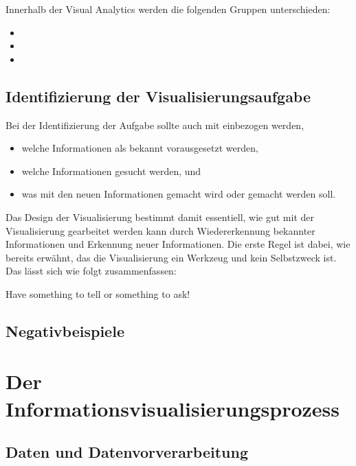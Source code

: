 		Innerhalb der Visual Analytics werden die folgenden Gruppen unterschieden:
		\begin{itemize}
			\item {}
			\item {}
			\item {}
		\end{itemize}

	\section{Identifizierung der Visualisierungsaufgabe}
		Bei der Identifizierung der Aufgabe sollte auch mit einbezogen werden,
		\begin{itemize}
			\item welche Informationen als bekannt vorausgesetzt werden,
			\item welche Informationen gesucht werden, und
			\item was mit den neuen Informationen gemacht wird oder gemacht werden soll.
		\end{itemize}
		Das Design der Visualisierung bestimmt damit essentiell, wie gut mit der Visualisierung gearbeitet werden kann durch Wiedererkennung bekannter Informationen und Erkennung neuer Informationen. Die erste Regel ist dabei, wie bereits erwähnt, das die Visualisierung ein Werkzeug und kein Selbstzweck ist. Das lässt sich wie folgt zusammenfassen:
		\begin{center}
			Have something to tell or something to ask!
		\end{center}

    \section{Negativbeispiele} %

\chapter{Der Informationsvisualisierungsprozess} %
	\label{c:visualisierungsprozess}


    \section{Daten und Datenvorverarbeitung} %

